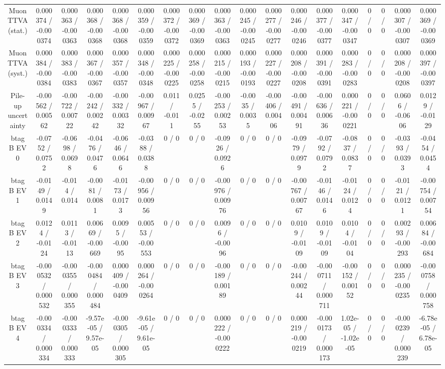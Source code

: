 \documentclass[10pt]{article}
\begin{document}
\begin{table}[htbp]
\begin{center}
\begin{tabular}{|c|c|c|c|c|c|c|c|c|c|c|c|c|c|c|c|c|c|}
  Muon TTVA (stat.) & 0.000374 / -0.000374 & 0.000363 / -0.000363 & 0.000368 / -0.000368 & 0.000368 / -0.000368 & 0.000359 / -0.000359 & 0.000372 / -0.000372 & 0.000369 / -0.000369 & 0.000363 / -0.000363 & 0.000245 / -0.000245 & 0.000277 / -0.000277 & 0.000246 / -0.000246 & 0.000377 / -0.000377 & 0.000347 / -0.000347 & 0 / 0 & 0 / 0 & 0.000307 / -0.000307 & 0.000369 / -0.000369 \\ 
  Muon TTVA (syst.) & 0.000384 / -0.000384 & 0.000383 / -0.000383 & 0.000367 / -0.000367 & 0.000357 / -0.000357 & 0.000348 / -0.000348 & 0.000225 / -0.000225 & 0.000258 / -0.000258 & 0.000215 / -0.000215 & 0.000193 / -0.000193 & 0.000227 / -0.000227 & 0.000208 / -0.000208 & 0.000391 / -0.000391 & 0.000283 / -0.000283 & 0 / 0 & 0 / 0 & 0.000208 / -0.000208 & 0.000397 / -0.000397 \\ 
  Pile-up uncertainty & -0.00562 / 0.00562 & -0.00722 / 0.00722 & -0.00242 / 0.00242 & -0.00332 / 0.00332 & -0.00967 / 0.00967 & 0.011 / -0.011 & 0.0255 / -0.0255 & -0.00253 / 0.00253 & -0.0035 / 0.0035 & -0.00406 / 0.00406 & -0.00491 / 0.00491 & -0.00636 / 0.00636 & 0.000221 / -0.000221 & 0 / 0 & 0 / 0 & 0.0606 / -0.0606 & 0.0129 / -0.0129 \\ 
  btag B EV 0 & -0.0752 / 0.0752 & -0.0698 / 0.0698 & -0.0476 / 0.0476 & -0.0646 / 0.0646 & -0.0388 / 0.0388 & 0 / 0 & 0 / 0 & -0.0926 / 0.0926 & 0 / 0 & 0 / 0 & -0.0979 / 0.0979 & -0.0792 / 0.0792 & -0.0837 / 0.0837 & 0 / 0 & 0 / 0 & -0.0393 / 0.0393 & -0.0454 / 0.0454 \\ 
  btag B EV 1 & -0.0149 / 0.0149 & -0.014 / 0.014 & -0.0081 / 0.0081 & -0.0173 / 0.0173 & -0.00956 / 0.00956 & 0 / 0 & 0 / 0 & -0.00976 / 0.00976 & 0 / 0 & 0 / 0 & -0.00767 / 0.00767 & -0.0146 / 0.0146 & -0.0124 / 0.0124 & 0 / 0 & 0 / 0 & -0.0121 / 0.0121 & -0.00754 / 0.00754 \\ 
  btag B EV 2 & 0.0124 / -0.0124 & 0.0113 / -0.0113 & 0.00669 / -0.00669 & 0.0095 / -0.0095 & 0.00553 / -0.00553 & 0 / 0 & 0 / 0 & 0.0096 / -0.0096 & 0 / 0 & 0 / 0 & 0.0109 / -0.0109 & 0.0109 / -0.0109 & 0.0104 / -0.0104 & 0 / 0 & 0 / 0 & 0.00293 / -0.00293 & 0.00684 / -0.00684 \\ 
  btag B EV 3 & -0.000532 / 0.000532 & -0.000355 / 0.000355 & -0.000484 / 0.000484 & 0.000409 / -0.000409 & 0.000264 / -0.000264 & 0 / 0 & 0 / 0 & -0.00189 / 0.00189 & 0 / 0 & 0 / 0 & -0.00244 / 0.00244 & -0.000711 / 0.000711 & -0.00152 / 0.00152 & 0 / 0 & 0 / 0 & 0.000235 / -0.000235 & -0.000758 / 0.000758 \\ 
  btag B EV 4 & -0.000334 / 0.000334 & -0.000333 / 0.000333 & -9.57e-05 / 9.57e-05 & -0.000305 / 0.000305 & -9.61e-05 / 9.61e-05 & 0 / 0 & 0 / 0 & 0.000222 / -0.000222 & 0 / 0 & 0 / 0 & 0.000219 / -0.000219 & -0.000173 / 0.000173 & 1.02e-05 / -1.02e-05 & 0 / 0 & 0 / 0 & -0.000239 / 0.000239 & -6.78e-05 / 6.78e-05 \\ 

\end{tabular}
\end{center}
\end{table}
\end{document}
